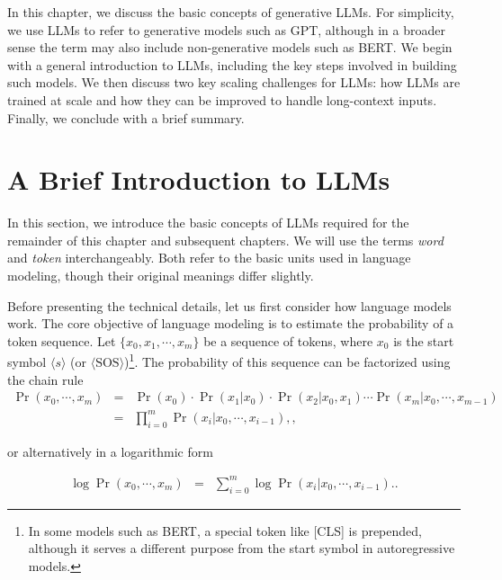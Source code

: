 In this chapter, we discuss the basic concepts of generative LLMs. For simplicity, we use LLMs to refer to generative models such as GPT, although in a broader sense the term may also include non-generative models such as BERT. We begin with a general introduction to LLMs, including the key steps involved in building such models. We then discuss two key scaling challenges for LLMs: how LLMs are trained at scale and how they can be improved to handle long-context inputs. Finally, we conclude with a brief summary.


\section{A Brief Introduction to LLMs}

In this section, we introduce the basic concepts of LLMs required for the remainder of this chapter and subsequent chapters. We will use the terms \textit{word} and \textit{token} interchangeably. Both refer to the basic units used in language modeling, though their original meanings differ slightly.

Before presenting the technical details, let us first consider how language models work. The core objective of language modeling is to estimate the probability of a token sequence. Let $\{x_0, x_1, \cdots, x_m\}$ be a sequence of tokens, where $x_0$ is the start symbol $\langle s \rangle$ (or $\langle \mathrm{SOS} \rangle$)\footnote{In some models such as BERT, a special token like [CLS] is prepended, although it serves a different purpose from the start symbol in autoregressive models.}. The probability of this sequence can be factorized using the chain rule
\begin{eqnarray}
\Pr(x_0,\cdots,x_m) & = & \Pr(x_0) \cdot \Pr(x_1|x_0) \cdot \Pr(x_2|x_0,x_1) \cdots \Pr(x_m|x_0,\cdots,x_{m-1}) \nonumber \\
                 & = & \prod_{i=0}^{m} \Pr(x_{i}|x_0,\cdots,x_{i-1}), \label{eq:lm-basic-form},
\end{eqnarray}

\noindent or alternatively in a logarithmic form

\begin{eqnarray}
\log \Pr(x_0,\cdots,x_m) & = & \sum_{i=0}^{m} \log \Pr(x_{i}|x_0,\cdots,x_{i-1}). \label{eq:lm-basic-form-log}.
\end{eqnarray}

